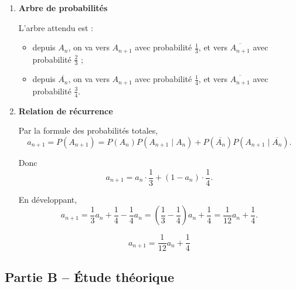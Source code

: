 \documentclass[11pt,a4paper]{article}
\begin{document}
\begin{enumerate}[label=\textbf{2.\arabic*}, leftmargin=1.6em]

\item \textbf{Arbre de probabilités}

L’arbre attendu est :
\begin{itemize}
    \item depuis \(A_n\), on va vers \(A_{n+1}\) avec probabilité \(\frac13\), et vers \(\overline{A_{n+1}}\) avec probabilité \(\frac23\) ;
    \item depuis \(\overline{A_n}\), on va vers \(A_{n+1}\) avec probabilité \(\frac14\), et vers \(\overline{A_{n+1}}\) avec probabilité \(\frac34\).
\end{itemize}

\item \textbf{Relation de récurrence}

Par la formule des probabilités totales,
\[
a_{n+1}=P(A_{n+1})
= P(A_n)P(A_{n+1}\mid A_n)+P(\overline{A_n})P(A_{n+1}\mid \overline{A_n}).
\]

Donc
\[
a_{n+1}=a_n\cdot \frac13 +(1-a_n)\cdot \frac14.
\]

En développant,
\[
a_{n+1}=\frac13 a_n+\frac14-\frac14 a_n
=\left(\frac13-\frac14\right)a_n+\frac14
=\frac1{12}a_n+\frac14.
\]

\[
\boxed{a_{n+1}=\frac1{12}a_n+\frac14}
\]

\end{enumerate}

\subsection*{Partie B -- Étude théorique}
\end{document}
